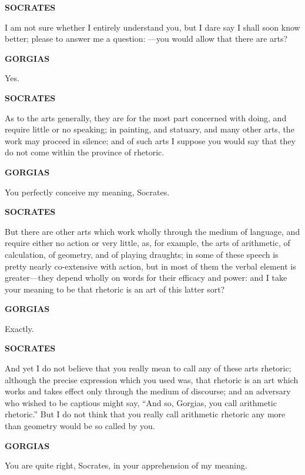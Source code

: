 \documentclass[11pt,letter]{article}
\begin{document}
\par \textbf{SOCRATES}
\par   I am not sure whether I entirely understand you, but I dare say I shall soon know better; please to answer me a question: —you would allow that there are arts?

\par \textbf{GORGIAS}
\par   Yes.

\par \textbf{SOCRATES}
\par   As to the arts generally, they are for the most part concerned with doing, and require little or no speaking; in painting, and statuary, and many other arts, the work may proceed in silence; and of such arts I suppose you would say that they do not come within the province of rhetoric.

\par \textbf{GORGIAS}
\par   You perfectly conceive my meaning, Socrates.

\par \textbf{SOCRATES}
\par   But there are other arts which work wholly through the medium of language, and require either no action or very little, as, for example, the arts of arithmetic, of calculation, of geometry, and of playing draughts; in some of these speech is pretty nearly co-extensive with action, but in most of them the verbal element is greater—they depend wholly on words for their efficacy and power:  and I take your meaning to be that rhetoric is an art of this latter sort?

\par \textbf{GORGIAS}
\par   Exactly.

\par \textbf{SOCRATES}
\par   And yet I do not believe that you really mean to call any of these arts rhetoric; although the precise expression which you used was, that rhetoric is an art which works and takes effect only through the medium of discourse; and an adversary who wished to be captious might say, “And so, Gorgias, you call arithmetic rhetoric.” But I do not think that you really call arithmetic rhetoric any more than geometry would be so called by you.

\par \textbf{GORGIAS}
\par   You are quite right, Socrates, in your apprehension of my meaning.
\end{document}
